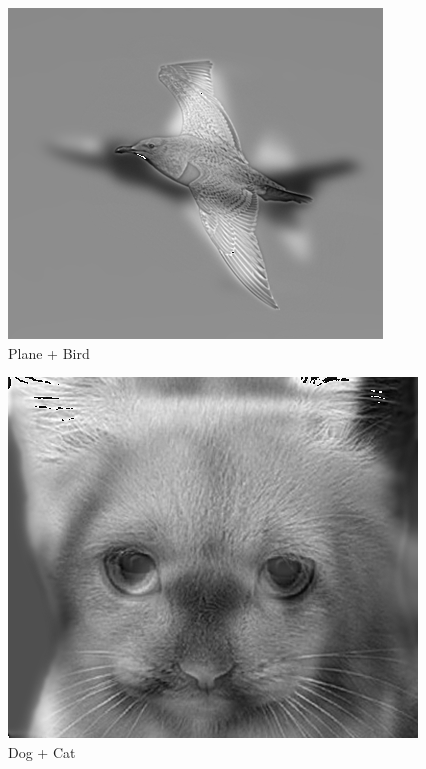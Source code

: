 \documentclass{article}
\begin{document}
\begin{minipage}{\linewidth}
    \centering
    \begin{minipage}{0.45\linewidth}
        \begin{figure}[H]
            \includegraphics[width=\linewidth]{Ejercicio3/hybrid3.png}          
			\caption{Plane + Bird}
        \end{figure}
    \end{minipage}
    \hspace{0.05\linewidth}
    \begin{minipage}{0.45\linewidth}
        \begin{figure}[H]
            \includegraphics[width=\linewidth]{Ejercicio3/hybrid4.png}          
			\caption{Dog + Cat}
        \end{figure}
    \end{minipage}   
    

\end{minipage}
\end{document}
